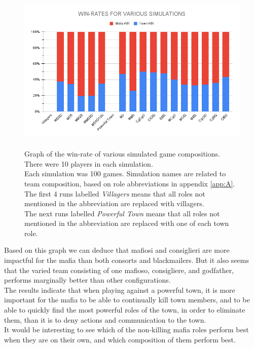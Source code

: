 \begin{figure}[H]
    \includegraphics[width=1\linewidth]{figures/Winrates}
    \caption{\\Graph of the win-rate of various simulated game compositions.\\
        There were 10 players in each simulation.\\
        Each simulation was 100 games.
        Simulation names are related to team composition, based on role
        abbreviations in appendix \ref{app:A}.\\
        The first 4 runs labelled \textit{Villagers} means that all roles not
        mentioned in the abbreviation are replaced with villagers.\\
        The next runs labelled \textit{Powerful Town} means that all roles not
        mentioned in the abbreviation are replaced with	one of each town role.}
    \label{fig:VariousSimulations}
\end{figure}
\vspace{-5px}Based on this graph we can deduce that mafiosi and
consiglieri are more
impactful for the mafia than both consorts and blackmailers. But it also seems
that the varied team consisting of one mafioso, consigliere, and godfather,
performs marginally better than other configurations. \\
The results indicate that when playing against a powerful town, it is more
important for the mafia to be able to continually kill town members, and to be
able to quickly find the most powerful roles of the town, in order to eliminate
them, than it is to deny actions and communication to the town. \\
It would be interesting to see which of the non-killing mafia roles perform
best when they are on their own, and which composition of them perform best.
